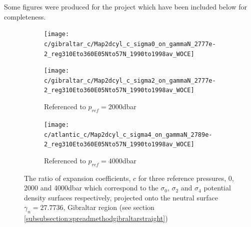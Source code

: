 \label{appendix_c}

Some figures were produced for the project which have been included below for completeness. 


\begin{figure}[htbp]
    \centering
     
     \begin{subfigure}{0.4\textwidth}
         
         \texttt{[image: c/gibraltar\_c/Map2dcyl\_c\_sigma0\_on\_gammaN\_2777e-2\_reg310Eto360E05Nto57N\_1990to1998av\_WOCE]}
         \label{fig:subplot_gibraltar_c_sig0}
     \end{subfigure}
     \begin{subfigure}{0.4\textwidth}
         
         \texttt{[image: c/gibraltar\_c/Map2dcyl\_c\_sigma2\_on\_gammaN\_2777e-2\_reg310Eto360E05Nto57N\_1990to1998av\_WOCE]}
         \caption{Referenced to $p_{ref} = 2000$dbar}
         \label{fig:subplot_gibraltar_c_sig2}
     \end{subfigure}
     
     \begin{subfigure}{0.4\textwidth}
         
         \texttt{[image: c/atlantic\_c/Map2dcyl\_c\_sigma4\_on\_gammaN\_2789e-2\_reg310Eto360E05Nto57N\_1990to1998av\_WOCE]}
         \caption{Referenced to $p_{ref} = 4000$dbar}
         \label{fig:subplot_gibraltar_c_sig4}
     \end{subfigure}
     
    \caption{The ratio of expansion coefficients, $c$ for three reference pressures, 0, 2000 and 4000dbar which correspond to the $\sigma_0$, $\sigma_2$ and $\sigma_4$ potential density surfaces respectively, projected onto the neutral surface $\gamma_n = 27.7736$, Gibraltar region (see section \ref{subsubsection:spreadmethodgibraltarstraight})}
    \label{fig:gibraltar_c}
    
\end{figure}

